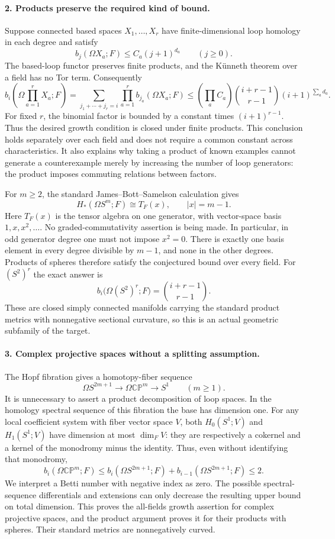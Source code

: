 \documentclass[11pt]{article}
\begin{document}
\paragraph{2. Products preserve the required kind of bound.}
Suppose connected based spaces $X_1,\ldots,X_r$ have finite-dimensional loop homology in each degree and satisfy
\[
 b_j(\Omega X_a;F)\leq C_a(j+1)^{d_a}\qquad(j\geq0).
\]
The based-loop functor preserves finite products, and the K\"unneth theorem over a field has no Tor term. Consequently
\[
 b_i\left(\Omega\prod_{a=1}^rX_a;F\right)
 =\sum_{j_1+\cdots+j_r=i}\prod_{a=1}^rb_{j_a}(\Omega X_a;F)
 \leq\left(\prod_a C_a\right)
 {i+r-1\choose r-1}(i+1)^{\sum_a d_a}.
\]
For fixed $r$, the binomial factor is bounded by a constant times $(i+1)^{r-1}$. Thus the desired growth condition is closed under finite products. This conclusion holds separately over each field and does not require a common constant across characteristics. It also explains why taking a product of known examples cannot generate a counterexample merely by increasing the number of loop generators: the product imposes commuting relations between factors.

For $m\geq2$, the standard James--Bott--Samelson calculation gives
\[
 H_*(\Omega S^m;F)\cong T_F(x),\qquad |x|=m-1.
\]
Here $T_F(x)$ is the tensor algebra on one generator, with vector-space basis $1,x,x^2,\ldots$. No graded-commutativity assertion is being made. In particular, in odd generator degree one must not impose $x^2=0$. There is exactly one basis element in every degree divisible by $m-1$, and none in the other degrees. Products of spheres therefore satisfy the conjectured bound over every field. For $(S^2)^r$ the exact answer is
\[
 b_i\bigl(\Omega(S^2)^r;F\bigr)={i+r-1\choose r-1}.
\]
These are closed simply connected manifolds carrying the standard product metrics with nonnegative sectional curvature, so this is an actual geometric subfamily of the target.

\paragraph{3. Complex projective spaces without a splitting assumption.}
The Hopf fibration gives a homotopy-fiber sequence
\[
 \Omega S^{2m+1}\longrightarrow\Omega\mathbb{CP}^{m}
 \longrightarrow S^1\qquad(m\geq1).
\]
It is unnecessary to assert a product decomposition of loop spaces. In the homology spectral sequence of this fibration the base has dimension one. For any local coefficient system with fiber vector space $V$, both $H_0(S^1;V)$ and $H_1(S^1;V)$ have dimension at most $\dim_FV$: they are respectively a cokernel and a kernel of the monodromy minus the identity. Thus, even without identifying that monodromy,
\[
 b_i(\Omega\mathbb{CP}^{m};F)
 \leq b_i(\Omega S^{2m+1};F)+b_{i-1}(\Omega S^{2m+1};F)\leq2.
\]
We interpret a Betti number with negative index as zero. The possible spectral-sequence differentials and extensions can only decrease the resulting upper bound on total dimension. This proves the all-fields growth assertion for complex projective spaces, and the product argument proves it for their products with spheres. Their standard metrics are nonnegatively curved.
\end{document}

